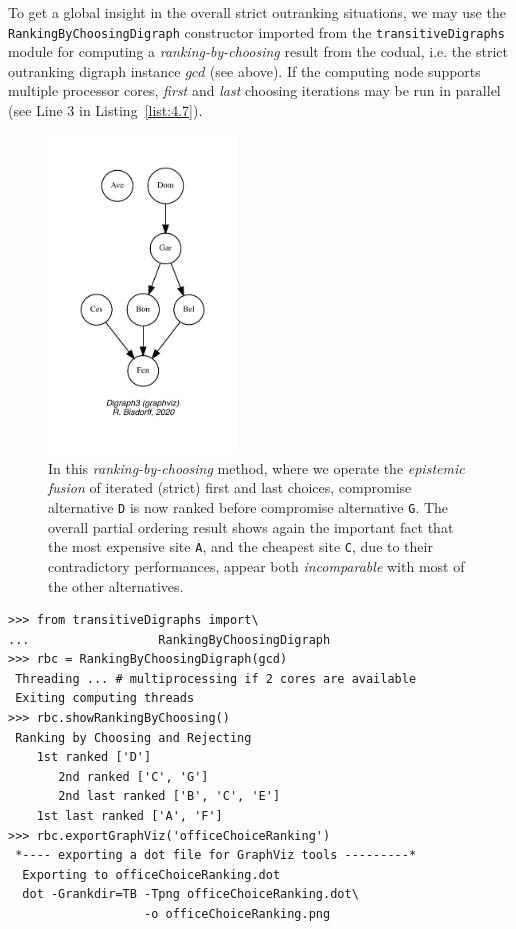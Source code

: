 To get a global insight in the overall strict outranking situations, we may use the \texttt{RankingByChoosingDigraph} constructor imported from the \texttt{transitive\-Digraphs} module for computing a \emph{ranking-by-choosing} result from the codual, i.e. the strict outranking digraph instance $gcd$ (see above). If the computing node supports multiple processor cores, \emph{first} and \emph{last} choosing iterations may be run in parallel (see Line 3 in Listing~\vref{list:4.7}).
\begin{figure}[h]
\sidecaption[t]
\includegraphics[width=5cm]{Figures/4-4-officeChoiceRanking.pdf}
\caption{In this \emph{ranking-by-choosing} method, where we operate the \emph{epistemic fusion} of iterated (strict) first and last choices, compromise alternative \texttt{D} is now ranked before compromise alternative \texttt{G}. The overall partial ordering result shows again the important fact that the most expensive site \texttt{A}, and the cheapest site \texttt{C}, due to their contradictory performances, appear both \emph{incomparable} with most of the other alternatives.} 
\label{fig:4.4}       %
\end{figure}
\begin{lstlisting}[caption={Ranking-by-choosing the outranking digraph},label=list:4.7]
>>> from transitiveDigraphs import\
...                  RankingByChoosingDigraph
>>> rbc = RankingByChoosingDigraph(gcd)
 Threading ... # multiprocessing if 2 cores are available
 Exiting computing threads
>>> rbc.showRankingByChoosing()
 Ranking by Choosing and Rejecting
    1st ranked ['D']
       2nd ranked ['C', 'G']
       2nd last ranked ['B', 'C', 'E']
    1st last ranked ['A', 'F']
>>> rbc.exportGraphViz('officeChoiceRanking')
 *---- exporting a dot file for GraphViz tools ---------*
  Exporting to officeChoiceRanking.dot
  dot -Grankdir=TB -Tpng officeChoiceRanking.dot\
                   -o officeChoiceRanking.png
\end{lstlisting}
